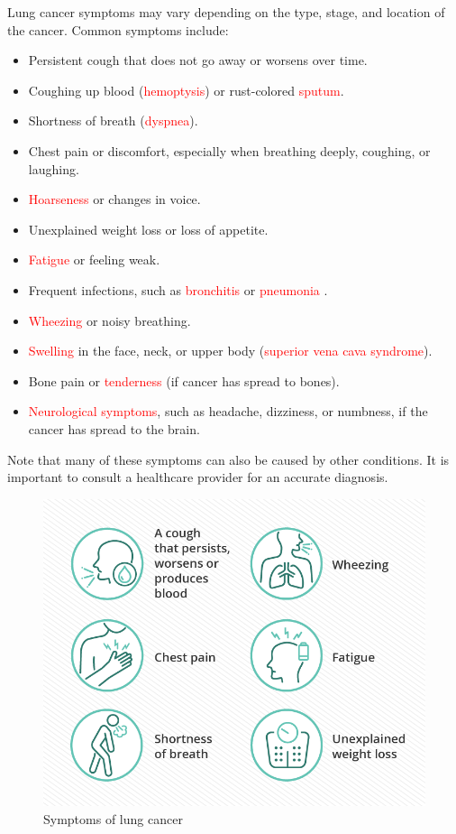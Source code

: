 Lung cancer symptoms may vary depending on the type, stage, and location of the cancer. Common symptoms include:

\begin{highlight}
\begin{itemize}
    \item Persistent cough that does not go away or worsens over time.
    \item Coughing up blood (\textcolor{red}{hemoptysis}) or rust-colored \textcolor{red}{sputum}.
    \item Shortness of breath (\textcolor{red}{dyspnea}).
    \item Chest pain or discomfort, especially when breathing deeply, coughing, or laughing.
    \item \textcolor{red}{Hoarseness} or changes in voice\cite{alrabeeah2024population}.
    \item Unexplained weight loss or loss of appetite.
    \item \textcolor{red}{Fatigue} or feeling weak.
    \item Frequent infections, such as \textcolor{red}{bronchitis} or \textcolor{red}{pneumonia} .
    \item \textcolor{red}{Wheezing} or noisy breathing.
    \item \textcolor{red}{Swelling} in the face, neck, or upper body (\textcolor{red}{superior vena cava syndrome})\cite{luo2024exploring}.
    \item Bone pain or \textcolor{red}{tenderness} (if cancer has spread to bones).
    \item \textcolor{red}{Neurological symptoms}, such as headache, dizziness, or numbness, if the cancer has spread to the brain\cite{liu2024effects}.
\end{itemize}
\end{highlight}
\begin{remark}
Note that many of these symptoms can also be caused by other conditions. It is important to consult a healthcare provider for an accurate diagnosis.
\end{remark}
\begin{figure}[h!]
    \centering
    \includegraphics[width= 0.675\linewidth]{images/Lung-Cancer-Symptoms-DT.png}
    \caption{Symptoms of lung cancer}
    \label{fig:symptoms}
\end{figure}

\newpage